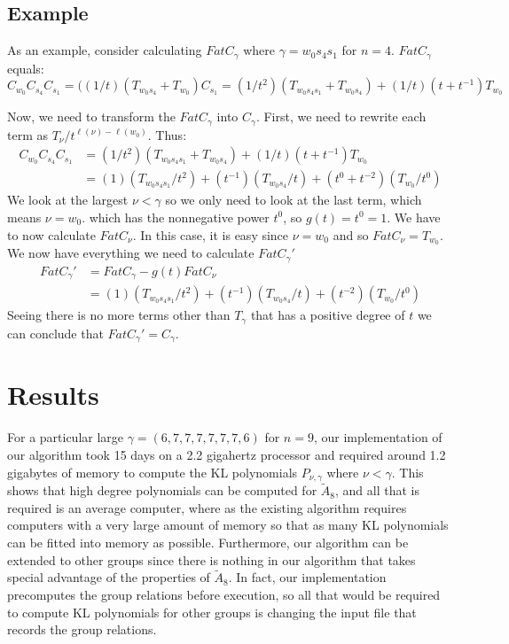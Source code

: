 \documentclass[12pt]{article} %
\begin{document}
\subsection{Example}

As an example, consider calculating $FatC_\gamma$ where $\gamma = w_0s_4s_1$ for $n = 4$. $FatC_\gamma$ equals:
$$ C_{w_0}C_{s_4}C_{s_1} = ((1/t)(T_{w_0s_4}+T_{w_0})C_{s_1} = (1/t^2)(T_{w_0 s_4 s_1} + T_{w_0 s_4}) + (1/t)(t+t^{-1})T_{w_0}$$

Now, we need to transform the $FatC_\gamma$ into $C_\gamma$. First, we need to rewrite each term as $T_\nu / t^{\ell(\nu)-\ell(w_0)}$. Thus:
\begin{align*}
 C_{w_0}C_{s_4}C_{s_1} &= (1/t^2)(T_{w_0 s_4 s_1} + T_{w_0 s_4}) + (1/t)(t+t^{-1})T_{w_0} \\
&= (1)(T_{w_0 s_4 s_1}/t^2) + (t^{-1})(T_{w_0 s_4}/t) + (t^0+t^{-2})(T_{w_0}/t^0) 
\end{align*}
We look at the largest $\nu < \gamma$ so we only need to look at the last term, which means $\nu = w_0$. which has the nonnegative power $t^0$, so $g(t) = t^0 = 1$. We have to now calculate $FatC_\nu$. In this case, it is easy since $\nu = w_0$ and so $FatC_\nu = T_{w_0}$. We now have everything we need to calculate $FatC_\gamma'$
\begin{align*}
FatC_\gamma ' &= FatC_\gamma - g(t)FatC_\nu \\
&=(1)(T_{w_0 s_4 s_1}/t^2) + (t^{-1})(T_{w_0 s_4}/t) + (t^{-2})(T_{w_0}/t^0) 
\end{align*}
Seeing there is no more terms other than $T_\gamma$ that has a positive degree of $t$ we can conclude that $FatC_\gamma' = C_\gamma$.

\section{Results}

 For a particular large $\gamma = (6,7,7,7,7,7,7,6)$ for $n=9$, our implementation of our algorithm took 15 days on a 2.2 gigahertz processor and required around 1.2 gigabytes of memory to compute the KL polynomials $P_{\nu,\gamma}$ where $\nu < \gamma$. This shows that high degree polynomials can be computed for $\tilde A_8$, and all that is required is an average computer, where as the existing algorithm requires computers with a very large amount of memory so that as many KL polynomials can be fitted into memory as possible. Furthermore, our algorithm can be extended to other groups since there is nothing in our algorithm that takes special advantage of the properties of $\tilde A_8$. In fact, our implementation precomputes the group relations before execution, so all that would be required to compute KL polynomials for other groups is changing the input file that records the group relations.
\end{document}
